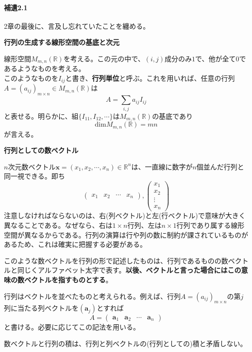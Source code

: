 \documentclass[dvipdfmx]{jsarticle}
\begin{document}
\paragraph{補遺2.1}\par
2章の最後に、言及し忘れていたことを纏める。\\\par
\textbf{行列の生成する線形空間の基底と次元}\par
線形空間$M_{m,n}(\mathbb{R})$を考える。この元の中で、$(i,j)$成分のみ$1$で、他が全て$0$であるようなものを考える。\\
このようなものを$I_{ij}$と書き、\textbf{行列単位}と呼ぶ。これを用いれば、任意の行列$A=(a_{ij})_{m \times n} \in M_{m,n}(\mathbb{R})$は
\[A=\sum_{i,j}a_{ij}I_{ij}\]
と表せる。明らかに、組$\{ I_{11},I_{12},\cdots \}$は$M_{m,n}(\mathbb{R})$の基底であり
\[\mathrm{dim}M_{m,n}(\mathbb{R})=mn\]
が言える。\\\par
\textbf{行列としての数ベクトル}\par
$n$次元数ベクトル$\bm{x}=(x_1,x_2,\cdots,x_n)\in\mathbb{R}^n$は、一直線に数字が$n$個並んだ行列と同一視できる。即ち
\[\begin{pmatrix}x_1&x_2&\cdots&x_n\end{pmatrix},\begin{pmatrix}x_1\\x_2\\\vdots\\x_n\end{pmatrix}\]
注意しなければならないのは、右(列ベクトル)と左(行ベクトル)で意味が大きく異なることである。なぜなら、右は$1 \times n$行列、左は$n \times 1$行列であり属する線形空間が異なるからである。行列の演算は行や列の数に制約が課されているものがあるため、これは確実に把握する必要がある。\par
このような数ベクトルを行列の形で記述したものは、行列であるものの数ベクトルと同じくアルファベット太字で表す。\textbf{以後、ベクトルと言った場合にはこの意味の数ベクトルを指すものとする}。\par
行列はベクトルを並べたものと考えられる。例えば、行列$A=(a_{ij})_{m \times n}$の第$j$列に当たる列ベクトルを$(\bm{a}_j)$とすれば
\[A=\begin{pmatrix}\bm{a}_1&\bm{a}_2&\cdots&\bm{a}_n\end{pmatrix}\]
と書ける。必要に応じてこの記法を用いる。\par
数ベクトルと行列の積は、行列と列ベクトルの(行列としての)積と矛盾しない。\\\par
\end{document}
